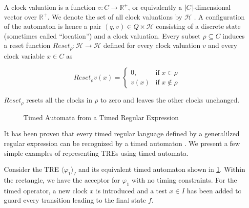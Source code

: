 \documentclass[]{sigplanconf}
\begin{document}
A clock valuation is a function $v \colon C \rightarrow \mathbb{R}^+$, or equivalently a $|C|$-dimensional vector over $\mathbb{R}^+$. We denote the set of all clock valuations by $\mathcal{H}$ . A configuration of the automaton is hence a pair $(q,v) \in Q \times \mathcal{H}$ consisting of a discrete state (sometimes called “location”) and a clock valuation. Every subset $\rho \subseteq C$ induces a reset function $Reset_\rho : \mathcal{H} \rightarrow \mathcal{H}$ defined for every clock valuation $v$ and every clock variable $x \in C$ as

\begin{equation}\label{timed_automaton}
Reset_\rho v(x) = \begin{cases}
0, & \text{if $x \in \rho$} \\
v(x) &\text{if $x \notin \rho$}
\end{cases}
\end{equation}

$Reset_\rho$ resets all the clocks in $\rho$ to zero and leaves the other clocks unchanged.

\begin{figure}
\caption{Timed Automata from a Timed Regular Expression}
\label{fig:tretoautomata}
\end{figure}


It has been proven that every timed regular language  defined by a generalilzed regular expression can be recognized by a timed automaton \cite{timedregex}. We present a few simple examples of representing TREs using timed automata.

Consider the TRE $\langle \varphi_1  \rangle_I$ and its equivalent timed automaton shown in \ref{fig:tretoautomata}. Within the rectangle, we have the acceptor for $\varphi_1$ with no timing constraints. For the timed operator, a new clock $x$ is introduced and a test $x \in I$ has been added to guard every transition leading to the final state $f$.
\end{document}
